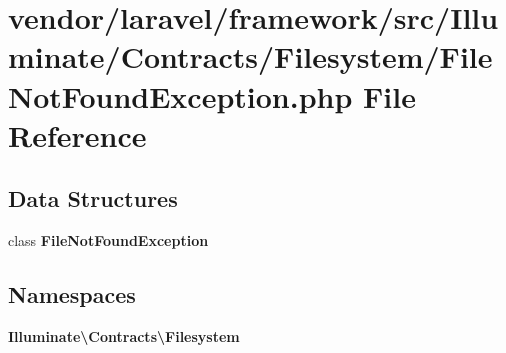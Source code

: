 \section{vendor/laravel/framework/src/\+Illuminate/\+Contracts/\+Filesystem/\+File\+Not\+Found\+Exception.php File Reference}
\label{laravel_2framework_2src_2_illuminate_2_contracts_2_filesystem_2_file_not_found_exception_8php}
\subsection*{Data Structures}
\begin{DoxyCompactItemize}
\item 
class {\bf File\+Not\+Found\+Exception}
\end{DoxyCompactItemize}
\subsection*{Namespaces}
\begin{DoxyCompactItemize}
\item 
 {\bf Illuminate\textbackslash{}\+Contracts\textbackslash{}\+Filesystem}
\end{DoxyCompactItemize}
